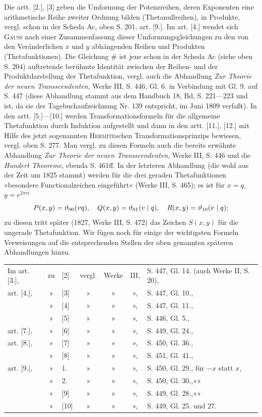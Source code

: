 \par\indent Die artt. [2.], [3] geben die Umformung der Potenzreihen, deren Exponenten eine arithmetische Reihe zweiter Ordnung bilden (Thetanullreihen), in Produkte, vergl. schon in der Scheda Ac, oben S. 201, art. [9.]. Im art. [4.] wendet sich \textsc{Gauss} nach einer Zusammenfassung dieser Umformungsgleichungen zu den von den  Veränderlichen $x$ und $y$ abhängenden Reihen und Produkten (Thetafunktionen). Die Gleichung $\#$ ist jene schon in der Scheda Ac (siehe oben S. 204) auftretende berühmte Identität zwischen der Reihen- und der Produktdarstellung der Thetafunktion, vergl. auch die Abhandlung \textit{Zur Theorie der neuen Transscendenten}, Werke III, S. 446, Gl. 6. in Verbindung mit Gl. 9. auf S. 447 (diese Abhandlung stammt aus dem Handbuch 18, Bd, S. 221---223 und ist, da sie der Tagebuchaufzeichnung Nr. 139 entspricht, im Juni 1809 verfaßt). In den artt. [5.]---[10.] werden Transformationsformeln für die allgemeine Thetafunktion durch Induktion aufgestellt und dann in den artt. [11.], [12.] mit Hilfe des jetzt sogenannten \textsc{Hermite}schen Transformationsprinzips bewiesen, vergl. oben S. 277. Man vergl. zu diesen Formeln auch die bereits erwähnte Abhandlung \textit{Zur Theorie der neuen Transscendenten}, Werke III, S. 446 und die \textit{Hundert Theoreme}, ebenda S. 461ff. In der letzteren Abhandlung (die wohl aus der Zeit um 1825 stammt) werden für die drei geraden Thetafunktionen »besondere Functionalzeichen eingeführt« (Werke III, S. 465); es ist für $x=q$, $y=e^{2\pi vi}$
\[P(x,y)=\vartheta_{00}(v\mathord{\raisebox{.75ex}{\rule{.3pt}{.65ex}}}q),\quad Q(x,y)=\vartheta_{01}(v\mid q),\quad R(x,y)=\vartheta_{10}(v\mid q);\]
\noindent zu diesen tritt später (1827, Werke III, S. 472) das Zeichen $S(x,y)$ für die ungerade Thetafunktion. Wir fügen noch für einige der wichtigsten Formeln Verweisungen auf die entsprechenden Stellen der oben genannten späteren Abhandlungen hinzu.
\par\medskip
{\small\setlength{\tabcolsep}{2pt}\renewcommand{\arraystretch}{1.0}
\noindent\begin{tabular}{@{}lclcccp{6.4cm}@{}}
Im art. [3.],&zu&[2]&vergl.&Werke&III,&S. 447, Gl. 14. (auch Werke II, S. 20),\\
art. [4.],&»&[3]&»&»&»,&S. 447, Gl. 10.,\\
&»&[4]&»&»&»,&S. 447, Gl. 11.,\\
&»&[5]&»&»&»,&S. 446, Gl. 5.,\\
art. [7.],&»&[6]&»&»&»,&S. 449, Gl. 24.,\\
art. [8.],&»&[7]&»&»&»,&S. 450, Gl. 36.,\\
&»&[8]&»&»&»,&S. 451, Gl. 41.,\\
art. [9.],&»&1.&»&»&»,&S. 450, Gl. 29., für $-x$ statt $x$,\\
&»&2.&»&»&»,&S. 450, Gl. 30.,\quad »\qquad »\\
&»&[9]&»&»&»,&S. 449, Gl. 28.,\quad »\qquad »\\
&»&[10]&»&»&»,&S. 449, Gl. 25. und 27.
\end{tabular}\par}
